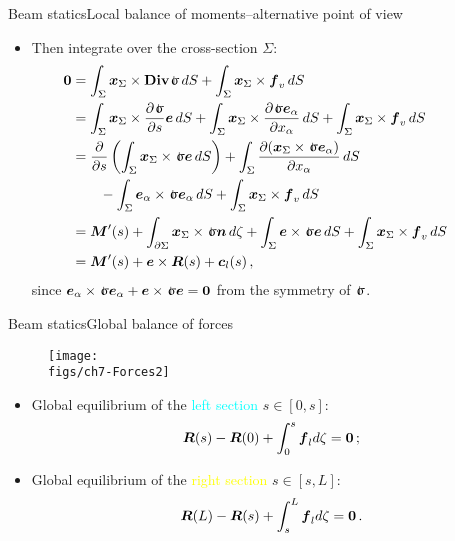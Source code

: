 \begin{frame}{Beam statics}{Local balance of moments--alternative point of view}

\begin{itemize}
\item Then integrate over the cross-section $\Sigma$:
\begin{displaymath}
\begin{split}
\!\!\!\!\!\!\!\!\!\!\!\!\!\! \bzero &=\int_\Sigma\xv_\Sigma\times\Div\stress\,\id S+\int_\Sigma\xv_\Sigma\times\fv_v\,\id S \\
\!\!\!\!\!\!\!\!\!\!\!\!\!\! &= \int_\Sigma\xv_\Sigma\times\frac{\partial\stress}{\partial s}\ev\,\id S + \int_\Sigma\xv_\Sigma\times\frac{\partial\stress\ev_\alpha}{\partial\xj_\alpha}\,\id S +\int_\Sigma\xv_\Sigma\times\fv_v\,\id S \\
\!\!\!\!\!\!\!\!\!\!\!\!\!\! &= \frac{\partial}{\partial s}\left(\int_\Sigma\xv_\Sigma\times\stress\ev\,\id S\right)+\int_\Sigma\frac{\partial(\xv_\Sigma\times\stress\ev_\alpha)}{\partial\xj_\alpha}\,\id S \\
\!\!\!\!\!\!\!\!\!\!\!\!\!\! &\quad\quad -\int_\Sigma\ev_\alpha\times\stress\ev_\alpha\,\id S +\int_\Sigma\xv_\Sigma\times\fv_v\,\id S \\
\!\!\!\!\!\!\!\!\!\!\!\!\!\! &=\Mres'(s)+ \int_{\partial\Sigma}\xv_\Sigma\times\stress\nv\,\id\zeta + \int_\Sigma\ev\times\stress\ev\,\id S + \int_\Sigma\xv_\Sigma\times\fv_v\,\id S \\
\!\!\!\!\!\!\!\!\!\!\!\!\!\! &=\Mres'(s)+\ev\times\Fres(s)+\cv_l(s)\,,
\end{split}
\end{displaymath}
since $\ev_\alpha\times\stress\ev_\alpha+\ev\times\stress\ev=\bzero$ from the symmetry of $\stress$.
\end{itemize}

\end{frame}

\begin{frame}{Beam statics}{Global balance of forces}

\begin{figure}
\centering\texttt{[image: \\figs/ch7-Forces2]}
\end{figure}

\begin{itemize}
\item Global equilibrium of the \textcolor{aqua}{left section} $s\in[0,s]$:
\begin{displaymath}
{\boldsymbol{R}}(s)-{\boldsymbol{R}}(0)+\int_0^s{\boldsymbol{f}}_ld \zeta={\bf 0}\,;
\end{displaymath}
\item  Global equilibrium of the \textcolor{yellow}{right section} $s\in[s,L]$:
\begin{displaymath}
{\boldsymbol{R}}(L)-{\boldsymbol{R}}(s)+\int_s^L{\boldsymbol{f}}_ld \zeta={\bf 0}\,.
\end{displaymath}
\end{itemize}

\end{frame}

